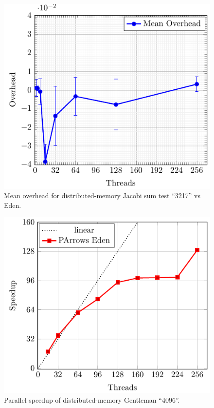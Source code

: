 \documentclass[paper=A4,twoside=true,openright,parskip=full,chapterprefix=true,headings=normal,bibliography=totoc,listof=totoc,titlepage=on,captions=tableabove,draft=false,british]{scrreprt}%
\renewcommand{\enquote}[1]{{``}#1{''}}
\begin{document}
\begin{figure}
\centering
\includegraphics{src/img/overDistJacobiEden.pdf}
\caption{Mean overhead for distributed-memory Jacobi sum test
\enquote{3217} vs Eden.\label{fig:overDistJacobiEden}}
\end{figure}

\begin{figure}
\centering
\includegraphics{src/img/perfDistTorus.pdf}
\caption{Parallel speedup of distributed-memory Gentleman
\enquote{4096}.\label{fig:perfDistTorus}}
\end{figure}
\end{document}
